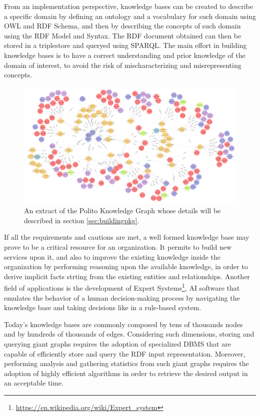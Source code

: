 \documentclass[%
    corpo=13.5pt,
    twoside,
    oldstyle,
    tipotesi=magistrale,
    greek,
    evenboxes
]{toptesi}
\begin{document}
From an implementation perspective, knowledge bases can be created to
describe a specific domain by defining an ontology and a vocabulary for
such domain using OWL and RDF Schema, and then by describing the concepts
of such domain using the RDF Model and Syntax. The RDF document obtained
can then be stored in a triplestore and queryed using SPARQL. The main effort
in building knowledge bases is to have a correct understanding and prior
knowledge of the domain of interest, to avoid the risk of mischaracterizing
and misrepresenting concepts.

\begin{figure}[h]
    \centering
    \includegraphics[scale=0.4]{img/geranium-knowledge-base-example.png}
    \caption{An extract of the Polito Knowledge Graph whose details will be
    described in section \ref{sec:buildingpkg}.}
    \label{fig:geranium-knowledge-base-example}
\end{figure}

If all the requirements and cautions are met, a well formed knowledge base may
prove to be a critical resource for an organization. It permits to
build new services upon it, and also to improve the existing knowledge inside
the organization by performing reasoning upon the available knowledge, in order
to derive implicit facts strting from the existing entities and relationships.
Another field of applications is the development of Expert Systems\footnote{\url{https://en.wikipedia.org/wiki/Expert_system}},
AI software that emulates the behavior of a human decision-making process by
navigating the knowledge base and taking decisions like in a rule-based system.

Today's knowledge bases are commonly composed by tens of
thousands nodes and by hundreds of thousands of edges.
Considering such dimensions, storing and querying giant graphs requires
the adoption of
specialized DBMS that are capable of efficiently store and query the RDF
input representation. Moreover, performing analysis and gathering statistics
from such giant graphs requires the adoption of highly efficient algorithms in
order to retrieve the desired output in an acceptable time.
\end{document}

